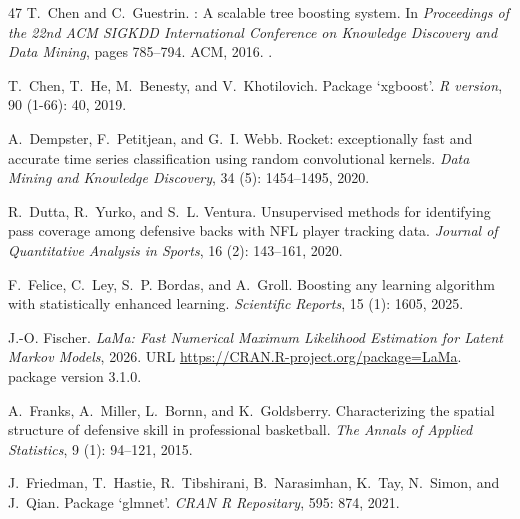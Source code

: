 \documentclass[namedate,webpdf,modern,medium]{oup-authoring-template}
\begin{document}
\begin{thebibliography}{47}
T.~Chen and C.~Guestrin.
: A scalable tree boosting system.
\newblock In \emph{Proceedings of the 22nd ACM SIGKDD International Conference
  on Knowledge Discovery and Data Mining}, pages 785--794. ACM, 2016.
\newblock {}.

T.~Chen, T.~He, M.~Benesty, and V.~Khotilovich.
\newblock Package ‘xgboost’.
\newblock \emph{R version}, 90 (1-66): 40, 2019.

A.~Dempster, F.~Petitjean, and G.~I. Webb.
\newblock Rocket: exceptionally fast and accurate time series classification
  using random convolutional kernels.
\newblock \emph{Data Mining and Knowledge Discovery}, 34 (5):
  1454--1495, 2020.

R.~Dutta, R.~Yurko, and S.~L. Ventura.
\newblock Unsupervised methods for identifying pass coverage among defensive
  backs with {NFL} player tracking data.
\newblock \emph{Journal of Quantitative Analysis in Sports}, 16
  (2): 143--161, 2020.

F.~Felice, C.~Ley, S.~P. Bordas, and A.~Groll.
\newblock Boosting any learning algorithm with statistically enhanced learning.
\newblock \emph{Scientific Reports}, 15 (1): 1605, 2025.

J.-O. Fischer.
\newblock \emph{{L}a{M}a: {F}ast {N}umerical {M}aximum {L}ikelihood
  {E}stimation for {L}atent {M}arkov {M}odels}, 2026.
\newblock URL \url{https://CRAN.R-project.org/package=LaMa}.
 package version 3.1.0.

A.~Franks, A.~Miller, L.~Bornn, and K.~Goldsberry.
\newblock Characterizing the spatial structure of defensive skill in
  professional basketball.
\newblock \emph{The Annals of Applied Statistics}, 9 (1):
  94--121, 2015.

J.~Friedman, T.~Hastie, R.~Tibshirani, B.~Narasimhan, K.~Tay, N.~Simon, and
  J.~Qian.
\newblock Package ‘glmnet’.
\newblock \emph{CRAN R Repositary}, 595: 874, 2021.


\end{thebibliography}
\end{document}
